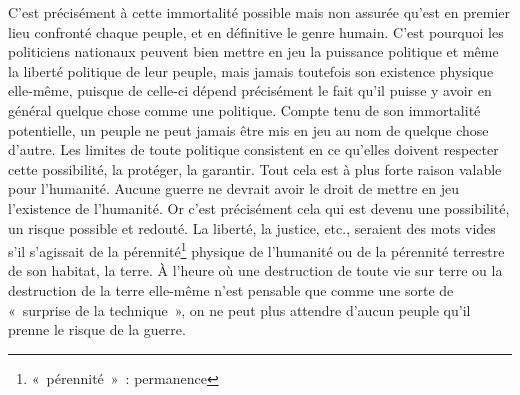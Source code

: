{C'est précisément à cette immortalité possible mais non assurée qu'est
en premier lieu confronté chaque peuple, et en définitive le genre
humain. C'est pourquoi les politiciens nationaux peuvent bien mettre
en jeu la puissance politique et même la liberté politique de leur
peuple, mais jamais toutefois son existence physique elle-même,
puisque de celle-ci dépend précisément le fait qu'il puisse y avoir
en général quelque chose comme une politique. Compte tenu de son
immortalité potentielle, un peuple ne peut jamais être mis en jeu au
nom de quelque chose d'autre. Les limites de toute politique
consistent en ce qu'elles doivent respecter cette possibilité, la
protéger, la garantir. Tout cela est à plus forte raison valable pour
l'humanité. Aucune guerre ne devrait avoir le droit de mettre en jeu
l'existence de l'humanité. Or c'est précisément cela qui est devenu
une possibilité, un risque possible et redouté. La liberté, la
justice, etc., seraient des mots vides s'il s'agissait de la
pérennité\footnote{«~pérennité~»~: permanence} physique de l'humanité ou de la pérennité terrestre de
son habitat, la terre. À l'heure où une destruction de toute vie sur
terre ou la destruction de la terre elle-même n'est pensable que
comme une sorte de «~surprise de la technique~», on ne peut plus
attendre d'aucun peuple qu'il prenne le risque de la guerre.
}


